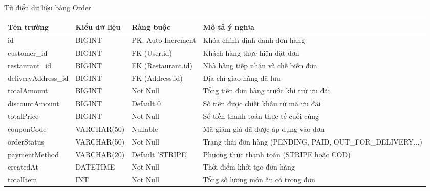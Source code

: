\documentclass{uetgraduation}
\begin{document}
\begin{table}[!htbp]{Từ điển dữ liệu bảng Order}
\centering
\small
\begin{tabularx}{\textwidth}{|>{\raggedright\arraybackslash}p{2.8cm}|>{\raggedright\arraybackslash}p{3.0cm}|>{\raggedright\arraybackslash}p{3.5cm}|>{\raggedright\arraybackslash}X|}
\hline
\textbf{Tên trường} & \textbf{Kiểu dữ liệu} & \textbf{Ràng buộc} & \textbf{Mô tả ý nghĩa} \\ \hline
id & BIGINT & PK, Auto Increment & Khóa chính định danh đơn hàng \\ \hline
customer\_id & BIGINT & FK (User.id) & Khách hàng thực hiện đặt đơn \\ \hline
restaurant\_id & BIGINT & FK (Restaurant.id) & Nhà hàng tiếp nhận và chế biến đơn \\ \hline
deliveryAddress\_id & BIGINT & FK (Address.id) & Địa chỉ giao hàng đã lưu \\ \hline
totalAmount & BIGINT & Not Null & Tổng tiền đơn hàng trước khi trừ ưu đãi \\ \hline
discountAmount & BIGINT & Default 0 & Số tiền được chiết khấu từ mã ưu đãi \\ \hline
totalPrice & BIGINT & Not Null & Số tiền thanh toán thực tế cuối cùng \\ \hline
couponCode & VARCHAR(50) & Nullable & Mã giảm giá đã được áp dụng vào đơn \\ \hline
orderStatus & VARCHAR(50) & Not Null & Trạng thái đơn hàng (PENDING, PAID, OUT\_FOR\_DELIVERY...) \\ \hline
paymentMethod & VARCHAR(20) & Default 'STRIPE' & Phương thức thanh toán (STRIPE hoặc COD) \\ \hline
createdAt & DATETIME & Not Null & Thời điểm khởi tạo đơn hàng \\ \hline
totalItem & INT & Not Null & Tổng số lượng món ăn có trong đơn \\ \hline
\end{tabularx}
\end{table}
\end{document}
